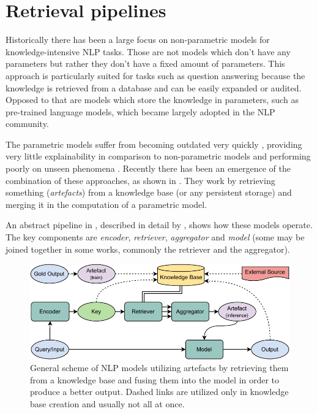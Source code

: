 \section{Retrieval pipelines}

Historically there has been a large focus on non-parametric models for knowledge-intensive NLP tasks.
Those are not models which don't have any parameters but rather they don't have a fixed amount of parameters.
This approach is particularly suited for tasks such as question answering because the knowledge is retrieved from a database and can be easily expanded or audited.
Opposed to that are models which store the knowledge in parameters, such as pre-trained language models, which became largely adopted in the NLP community.

The parametric models suffer from becoming outdated very quickly \citep{lazaridou2021pitfalls}, providing very little explainability in comparison to non-parametric models and performing poorly on unseen phenomena \citep{logan2019baracks}.
Recently there has been an emergence of the combination of these approaches, as shown in .
They work by retrieving something (\emph{artefacts}) from a knowledge base (or any persistent storage) and merging it in the computation of a parametric model.

An abstract pipeline in , described in detail by \citet{zouhar2021artefact}, shows how these models operate.
The key components are \textit{encoder}, \textit{retriever}, \textit{aggregator} and \textit{model} (some may be joined together in some works, commonly the retriever and the aggregator).


\begin{figure}[ht]
    \vspace{0.5cm}
    \center
    \includegraphics[width=\textwidth]{img/artefacts_diagram.pdf}
    \caption{General scheme of NLP models utilizing artefacts by retrieving them from a knowledge base and fusing them into the model in order to produce a better output. Dashed links are utilized only in knowledge base creation and usually not all at once.}
    \label{fig:artefacts_diagram}
\end{figure}

